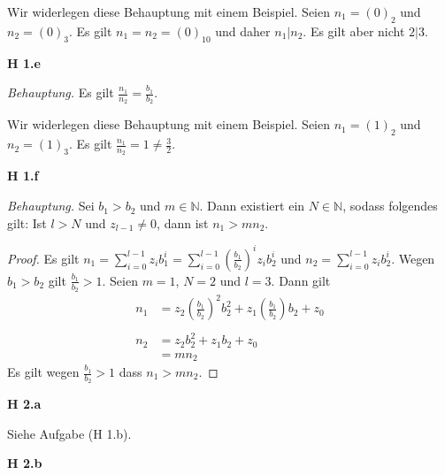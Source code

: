 \documentclass[12pt]{extarticle}
\begin{document}
Wir widerlegen diese Behauptung mit einem Beispiel.  Seien \(n_1=(0)_2\)
und \(n_2=(0)_3\).  Es gilt \(n_1=n_2=(0)_{10}\) und daher \(n_1|n_2\).  Es
gilt aber nicht \(2|3\).

\vspace{4mm}

\textbf{H 1.e}

\textit{Behauptung.}  Es gilt \(\frac{n_1}{n_2}=\frac{b_1}{b_2}\).

\vspace{4mm}

Wir widerlegen diese Behauptung mit einem Beispiel.  Seien \(n_1=(1)_2\)
und \(n_2=(1)_3\).  Es gilt \(\frac{n_1}{n_2}=1\neq \frac{3}{2}\).

\vspace{4mm}

\textbf{H 1.f}

\textit{Behauptung.}  Sei \(b_1 > b_2\) und \(m \in \mathbb{N}\).  Dann
existiert ein \(N \in \mathbb{N}\), sodass folgendes gilt:  Ist \(l > N\)
und \(z_{l-1}\neq 0\), dann ist \(n_1 > mn_2\).

\vspace{4mm}

\begin{proof}
  Es gilt
  $n_1=\sum_{i=0}^{l-1}{z_ib_1^i}=\sum_{i=0}^{l-1}{ \left(
      \frac{b_1}{b_2} \right)^iz_i b_2^i}$ und
  \(n_2=\sum_{i=0}^{l-1}{z_ib_2^i}\).  Wegen \(b_1>b_2\) gilt
  \(\frac{b_1}{b_2}>1\).
  Seien \(m=1\), \(N=2\) und \(l=3\).  Dann gilt
\begin{align*}
n_1&=z_2\left(\frac{b_1}{b_2} \right)^2 b_2^2 +
     z_1\left(\frac{b_1}{b_2} \right) b_2 + z_0\\\\
  n_2&=z_2 b_2^2 + z_1 b_2 + z_0\\
     &=mn_2
\end{align*}
Es gilt wegen \(\frac{b_1}{b_2}>1\) dass \(n_1>mn_2\).
\end{proof}
\vspace{4mm}

\newpage

\textbf{H 2.a}

\vspace{4mm}

Siehe Aufgabe (H 1.b).

\vspace{4mm}

\textbf{H 2.b}

\vspace{4mm}
\end{document}
